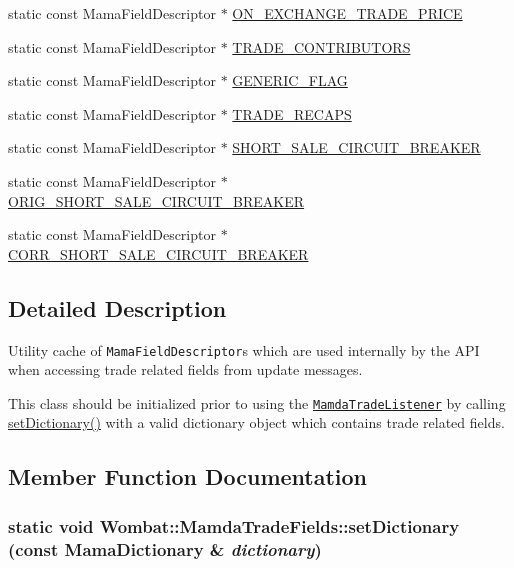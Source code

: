 \begin{CompactItemize}
\item 
static const Mama\-Field\-Descriptor $\ast$ \hyperlink{classWombat_1_1MamdaTradeFields_42d2e222639e61c5b6b03385c42c0f41}{ON\_\-EXCHANGE\_\-TRADE\_\-PRICE}
\item 
static const Mama\-Field\-Descriptor $\ast$ \hyperlink{classWombat_1_1MamdaTradeFields_70b70fd3681eac1e7e6e3092720b8af7}{TRADE\_\-CONTRIBUTORS}
\item 
static const Mama\-Field\-Descriptor $\ast$ \hyperlink{classWombat_1_1MamdaTradeFields_3428193f62baa321da4b8fabc6c2f854}{GENERIC\_\-FLAG}
\item 
static const Mama\-Field\-Descriptor $\ast$ \hyperlink{classWombat_1_1MamdaTradeFields_ea1f3f9534bf2d3f55a1be4e425a4a3d}{TRADE\_\-RECAPS}
\item 
static const Mama\-Field\-Descriptor $\ast$ \hyperlink{classWombat_1_1MamdaTradeFields_08935a4c527a67f176bfff17d0edff54}{SHORT\_\-SALE\_\-CIRCUIT\_\-BREAKER}
\item 
static const Mama\-Field\-Descriptor $\ast$ \hyperlink{classWombat_1_1MamdaTradeFields_44d45b6dc1a8124b717c6c55124bde43}{ORIG\_\-SHORT\_\-SALE\_\-CIRCUIT\_\-BREAKER}
\item 
static const Mama\-Field\-Descriptor $\ast$ \hyperlink{classWombat_1_1MamdaTradeFields_1f5755c44eb2062a5e78ede6dd1fbe89}{CORR\_\-SHORT\_\-SALE\_\-CIRCUIT\_\-BREAKER}
\end{CompactItemize}


\subsection{Detailed Description}
Utility cache of {\tt Mama\-Field\-Descriptor}s which are used internally by the API when accessing trade related fields from update messages. 

This class should be initialized prior to using the {\tt \hyperlink{classWombat_1_1MamdaTradeListener}{Mamda\-Trade\-Listener}} by calling \hyperlink{classWombat_1_1MamdaTradeFields_24f9db0ce37349e5a86bcd18f9c93d27}{set\-Dictionary()} with a valid dictionary object which contains trade related fields. 



\subsection{Member Function Documentation}
\hypertarget{classWombat_1_1MamdaTradeFields_24f9db0ce37349e5a86bcd18f9c93d27}{
\subsubsection[setDictionary]{\setlength{\rightskip}{0pt plus 5cm}static void Wombat::Mamda\-Trade\-Fields::set\-Dictionary (const Mama\-Dictionary \& {\em dictionary})}}
\label{classWombat_1_1MamdaTradeFields_24f9db0ce37349e5a86bcd18f9c93d27}


